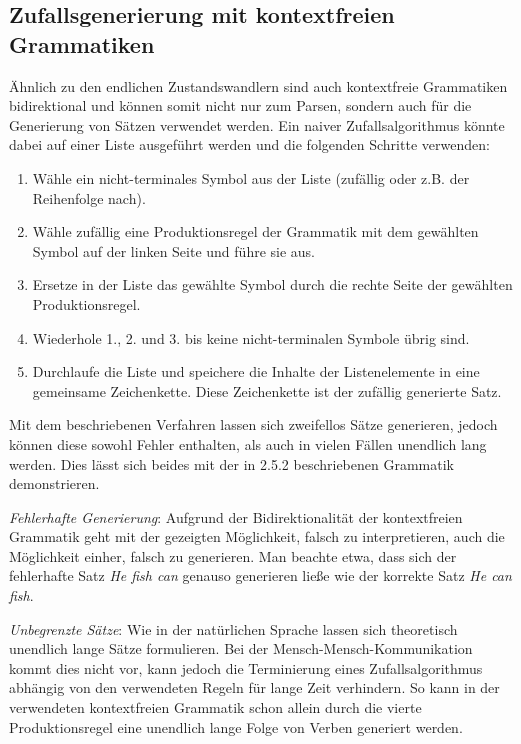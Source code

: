 \documentclass[12pt]{report}
\begin{document}
\subsection{Zufallsgenerierung mit kontextfreien \\Grammatiken}
Ähnlich zu den endlichen Zustandswandlern sind auch kontextfreie Grammatiken bidirektional und können somit nicht nur zum Parsen, sondern auch für die Generierung von Sätzen verwendet werden. 
Ein naiver Zufallsalgorithmus könnte dabei auf einer Liste ausgeführt werden und die folgenden Schritte verwenden:

\begin{enumerate}
\item Wähle ein nicht-terminales Symbol aus der Liste (zufällig oder z.B. der Reihenfolge nach).
\item Wähle zufällig eine Produktionsregel der Grammatik mit dem gewählten Symbol auf der linken Seite und führe sie aus. 
\item Ersetze in der Liste das gewählte Symbol durch die rechte Seite der gewählten Produktionsregel.
\item Wiederhole 1., 2. und 3. bis keine nicht-terminalen Symbole übrig sind. 
\item Durchlaufe die Liste und speichere die Inhalte der Listenelemente in eine gemeinsame Zeichenkette. Diese Zeichenkette ist der zufällig generierte Satz. 
\end{enumerate}

Mit dem beschriebenen Verfahren lassen sich zweifellos Sätze generieren, jedoch können diese sowohl Fehler enthalten, als auch in vielen Fällen unendlich lang werden. Dies lässt sich beides mit der in 2.5.2 beschriebenen Grammatik demonstrieren. 

\textit{Fehlerhafte Generierung}: Aufgrund der Bidirektionalität der kontextfreien Grammatik geht mit der gezeigten Möglichkeit, falsch zu interpretieren, auch die Möglichkeit einher, falsch zu generieren. Man beachte etwa, dass sich der fehlerhafte Satz \textit{\glqq  He fish can\grqq{}} genauso generieren ließe wie der korrekte Satz \textit{\glqq  He can fish\grqq{}}.

\textit{Unbegrenzte Sätze}: Wie in der natürlichen Sprache lassen sich theoretisch unendlich lange Sätze formulieren. Bei der Mensch-Mensch-Kommunikation kommt dies nicht vor, kann jedoch die Terminierung eines Zufallsalgorithmus abhängig von den verwendeten Regeln für lange Zeit verhindern. So kann in der verwendeten kontextfreien Grammatik schon allein durch die vierte Produktionsregel eine unendlich lange Folge von Verben generiert werden.
\end{document}
